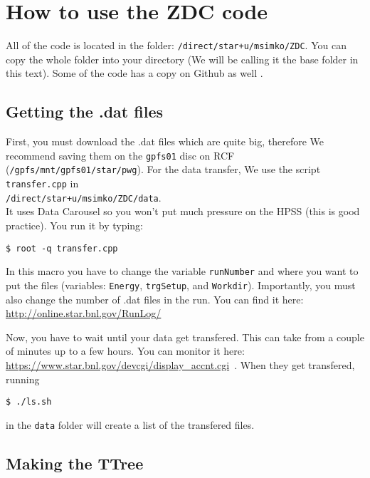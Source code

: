 \section{How to use the ZDC code}\hypertarget{how-to-use-the-zdc-code}{}\label{how-to-use-the-zdc-code}

All of the code is located in the folder: \texttt{/direct/star+u/msimko/ZDC}. You can copy the whole folder into
your directory (We will be calling it the base folder in this text). Some of the code has
a copy on Github as well \cite{ZdcGithubRepo}.

\subsection{Getting the .dat files}\hypertarget{getting-the-dat-files}{}\label{getting-the-dat-files}

First, you must download the .dat files which are quite big, therefore We recommend saving them on
the \texttt{gpfs01} disc on RCF (\texttt{/gpfs/mnt/gpfs01/star/pwg}). For the data transfer, We use the script
\texttt{transfer.cpp} in\\
\texttt{/direct/star+u/msimko/ZDC/data}.\\
It uses Data Carousel so you won't put much
pressure on the HPSS (this is good practice). You run it by typing:
\begin{verbatim}
$ root -q transfer.cpp
\end{verbatim}
In this macro you have to change the variable
\texttt{runNumber} and where you want to put the files (variables: \texttt{Energy}, \texttt{trgSetup}, 
and \texttt{Workdir}).
Importantly, you must also change the number of .dat files in the run. You can find it here:
\href{http://online.star.bnl.gov/RunLog/}{http://online.star.bnl.gov/RunLog/}

Now, you have to wait until your data get transfered. This can take from a couple of minutes up to a few hours.
You can monitor it here:
\url{https://www.star.bnl.gov/devcgi/display_accnt.cgi}~\cite{hpss}.
When they get transfered, running
\begin{verbatim}
$ ./ls.sh
\end{verbatim}
in the \texttt{data} folder will create a list of the transfered files.

\subsection{Making the TTree}\hypertarget{making-the-ttree}{}\label{making-the-ttree}

